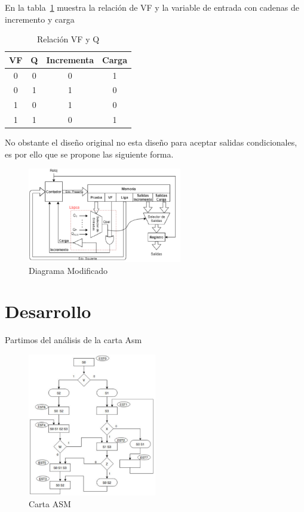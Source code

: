 \documentclass[table]{scrartcl}
\begin{document}
En la tabla~\ref{tab:1}  muestra la relación de VF y la variable de entrada con
cadenas de incremento y carga
\begin{table}[H]
  \centering
  \caption{Relación VF y Q}\label{tab:1}
  \begin{tabular}{|cc|c|c|}
    \hline
    VF & Q & Incrementa & Carga \\ \hline
    0 & 0 & 0 & 1 \\
    0 & 1 & 1 & 0 \\
    1 & 0 & 1 & 0 \\
    1 & 1 & 0 & 1 \\ \hline
  \end{tabular}
\end{table}

No obstante el diseño original no esta diseño para aceptar salidas
condicionales, es por ello que se propone las siguiente forma.
\begin{figure}[htbp]
  \centering
  \includegraphics[width=0.6\textwidth]{./img/3.png}
  \caption{Diagrama Modificado}\label{fig:3}
\end{figure}


\newpage{}
\section{Desarrollo}\label{sec:orgac7043c}
Partimos del análisis de la carta Asm
\begin{figure}[H]
  \centering
  \includegraphics[width=0.5\textwidth]{./img/4.png}
  \caption{Carta ASM}\label{fig:4}
\end{figure}
\end{document}
